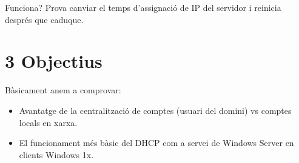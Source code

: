 \documentclass[
  a4paper,
]{article}
\begin{document}
Funciona? Prova canviar el temps d'assignació de IP del servidor i
reinicia després que caduque.

\section{3 Objectius}\label{objectius}

Bàsicament anem a comprovar:

\begin{itemize}
\item
  Avantatge de la centralització de comptes (usuari del domini) vs
  comptes locals en xarxa.
\item
  El funcionament més bàsic del DHCP com a servei de Windows Server en
  clients Windows 1x.
\end{itemize}
\end{document}
